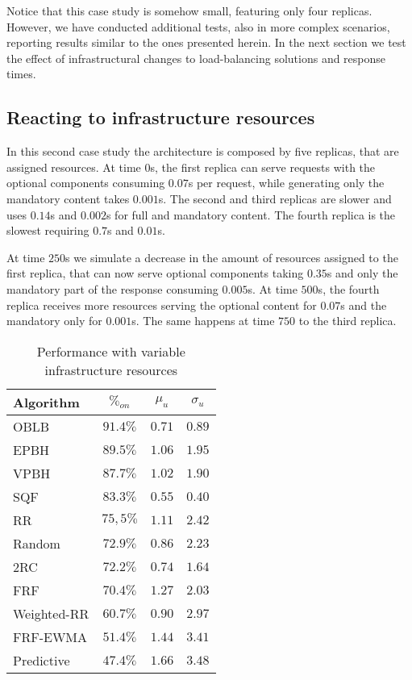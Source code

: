 Notice that this case study is somehow small, featuring only four
replicas.  However, we have conducted additional tests, also in more
complex scenarios, reporting results similar to the ones presented
herein. In the next section we test the effect of infrastructural
changes to load-balancing solutions and response times.

\subsection{Reacting to infrastructure resources}

In this second case study the architecture is composed by five
replicas, that are assigned resources. At time $0$s, the first replica
can serve requests with the optional components consuming $0.07$s per
request, while generating only the mandatory content takes
$0.001$s. The second and third replicas are slower and uses $0.14$s
and $0.002$s for full and mandatory content. The fourth replica is the
slowest requiring $0.7$s and $0.01$s.

At time $250$s we simulate a decrease in the amount of resources
assigned to the first replica, that can now serve optional components
taking $0.35$s and only the mandatory part of the response consuming
$0.005$s. At time $500$s, the fourth replica receives more resources
serving the optional content for $0.07$s and the mandatory only for
$0.001$s. The same happens at time $750$ to the third replica.

\begin{table}
\centering
\caption{Performance with variable infrastructure resources}
\label{tab:resourcechanges-performance}
\begin{tabular}{l c c c}
\hline
Algorithm   & $\%_{on}$ & $\mu_u$ & $\sigma_u$ \\
\hline
OBLB        & $\mathbf{91.4\%}$ & $0.71$          & $0.89$ \\
EPBH        & $89.5\%$          & $1.06$          & $1.95$ \\
VPBH        & $87.7\%$          & $1.02$          & $1.90$ \\
SQF         & $83.3\%$          & $\mathbf{0.55}$ & $\mathbf{0.40}$ \\
RR          & $75,5\%$          & $1.11$          & $2.42$ \\
Random      & $72.9\%$          & $0.86$          & $2.23$ \\
2RC         & $72.2\%$          & $0.74$          & $1.64$ \\
FRF         & $70.4\%$          & $1.27$          & $2.03$ \\
Weighted-RR & $60.7\%$          & $0.90$          & $2.97$ \\
FRF-EWMA    & $51.4\%$          & $1.44$          & $3.41$ \\
Predictive  & $47.4\%$          & $1.66$          & $3.48$ \\
\hline
\end{tabular}
\end{table}

